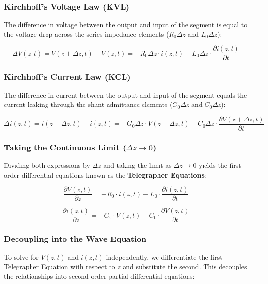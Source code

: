 \documentclass[
]{article}
\begin{document}
\subsubsection{Kirchhoff's Voltage Law
(KVL)}\label{kirchhoffs-voltage-law-kvl}

The difference in voltage between the output and input of the segment is
equal to the voltage drop across the series impedance elements
(\(R_0 \Delta z\) and \(L_0 \Delta z\)):

\[\Delta V(z,t) = V(z+\Delta z, t) - V(z,t) = -R_0 \Delta z \cdot i(z,t) - L_0 \Delta z \cdot \frac{\partial i(z,t)}{\partial t}\]

\subsubsection{Kirchhoff's Current Law
(KCL)}\label{kirchhoffs-current-law-kcl}

The difference in current between the output and input of the segment
equals the current leaking through the shunt admittance elements
(\(G_0 \Delta z\) and \(C_0 \Delta z\)):

\[\Delta i(z,t) = i(z+\Delta z, t) - i(z,t) = -G_0 \Delta z \cdot V(z+\Delta z,t) - C_0 \Delta z \cdot \frac{\partial V(z+\Delta z,t)}{\partial t}\]

\subsubsection{\texorpdfstring{Taking the Continuous Limit
(\(\Delta z \to 0\))}{Taking the Continuous Limit (\textbackslash Delta z \textbackslash to 0)}}\label{taking-the-continuous-limit-delta-z-to-0}

Dividing both expressions by \(\Delta z\) and taking the limit as
\(\Delta z \to 0\) yields the first-order differential equations known
as the \textbf{Telegrapher Equations}:

\[\frac{\partial V(z,t)}{\partial z} = -R_0 \cdot i(z,t) - L_0 \cdot \frac{\partial i(z,t)}{\partial t}\]

\[\frac{\partial i(z,t)}{\partial z} = -G_0 \cdot V(z,t) - C_0 \cdot \frac{\partial V(z,t)}{\partial t}\]

\subsubsection{Decoupling into the Wave
Equation}\label{decoupling-into-the-wave-equation}

To solve for \(V(z,t)\) and \(i(z,t)\) independently, we differentiate
the first Telegrapher Equation with respect to \(z\) and substitute the
second. This decouples the relationships into second-order partial
differential equations:
\end{document}
